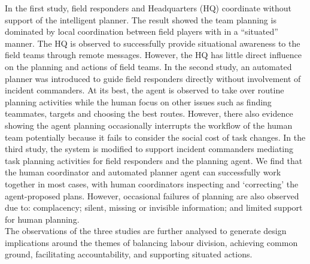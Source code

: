 In the first study, field responders and Headquarters (HQ) coordinate without support of the intelligent planner. The result showed the team planning is dominated by local coordination between field players with in a ``situated'' manner. The HQ is observed to successfully provide situational awareness to the field teams through remote messages. However, the HQ has little direct influence on the planning and actions of field teams. In the second study, an automated planner was introduced to guide field responders directly without involvement of incident commanders. At its best, the agent is observed to take over routine planning activities while the human focus on other issues such as finding teammates, targets and choosing the best routes. However, there  also evidence showing the agent planning occasionally interrupts the  workflow of the human team potentially because it fails to consider the social cost of task changes. In the third study, the system is modified to support incident commanders mediating task planning activities for field responders and the planning agent. We find that the human coordinator and automated planner agent can successfully work together in most cases, with human coordinators inspecting and `correcting' the agent-proposed plans. However, occasional failures of planning are also observed due to: complacency; silent, missing or invisible information; and limited support for human planning. \\

The observations of the three studies are further analysed to generate design implications around the themes of balancing labour division, achieving common ground, facilitating accountability, and supporting situated actions.\\  


\endgroup			

\vfill